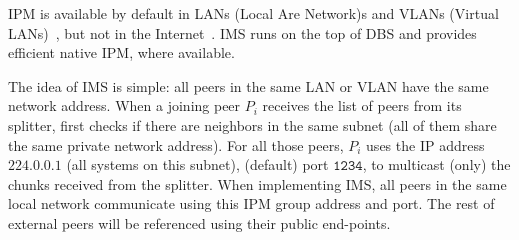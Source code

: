 
\label{sec:IPM}

IPM is available by default in LANs (Local Are Network)s and VLANs
(Virtual LANs)~\cite{shabtay2011ip}, but not in the
Internet~\cite{Comer1}. IMS runs on the top of DBS and provides
efficient native IPM, where available.

The idea of IMS is simple: all peers in the same LAN or VLAN have the
same network address. When a joining peer $P_i$ receives the list of
peers from its splitter, first checks if there are neighbors in the
same subnet (all of them share the same private network address). For
all those peers, $P_i$ uses the IP address $\mathtt{224.0.0.1}$ (all
systems on this subnet), (default) port $\mathtt{1234}$, to multicast
(only) the chunks received from the splitter. When implementing IMS,
all peers in the same local network communicate using this IPM group
address and port. The rest of external peers will be referenced using
their public end-points.

